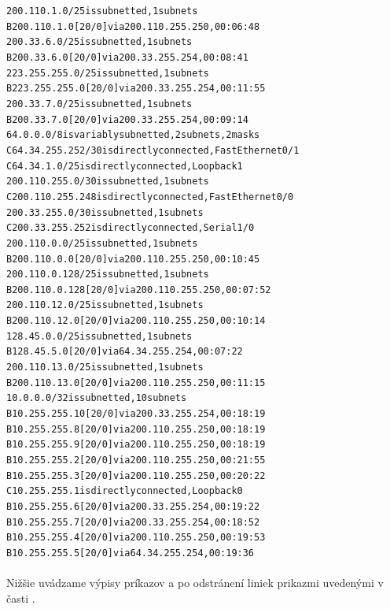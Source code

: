 \documentclass[12pt,twoside,a4paper]{report}
\begin{document}
{\begin{small}
\begin{alltt}
     200.110.1.0/25 is subnetted, 1 subnets
B       200.110.1.0 [20/0] via 200.110.255.250, 00:06:48
     200.33.6.0/25 is subnetted, 1 subnets
B       200.33.6.0 [20/0] via 200.33.255.254, 00:08:41
     223.255.255.0/25 is subnetted, 1 subnets
B       223.255.255.0 [20/0] via 200.33.255.254, 00:11:55
     200.33.7.0/25 is subnetted, 1 subnets
B       200.33.7.0 [20/0] via 200.33.255.254, 00:09:14
     64.0.0.0/8 is variably subnetted, 2 subnets, 2 masks
C       64.34.255.252/30 is directly connected, FastEthernet0/1
C       64.34.1.0/25 is directly connected, Loopback1
     200.110.255.0/30 is subnetted, 1 subnets
C       200.110.255.248 is directly connected, FastEthernet0/0
     200.33.255.0/30 is subnetted, 1 subnets
C       200.33.255.252 is directly connected, Serial1/0
     200.110.0.0/25 is subnetted, 1 subnets
B       200.110.0.0 [20/0] via 200.110.255.250, 00:10:45
     200.110.0.128/25 is subnetted, 1 subnets
B       200.110.0.128 [20/0] via 200.110.255.250, 00:07:52
     200.110.12.0/25 is subnetted, 1 subnets
B       200.110.12.0 [20/0] via 200.110.255.250, 00:10:14
     128.45.0.0/25 is subnetted, 1 subnets
B       128.45.5.0 [20/0] via 64.34.255.254, 00:07:22
     200.110.13.0/25 is subnetted, 1 subnets
B       200.110.13.0 [20/0] via 200.110.255.250, 00:11:15
     10.0.0.0/32 is subnetted, 10 subnets
B       10.255.255.10 [20/0] via 200.33.255.254, 00:18:19
B       10.255.255.8 [20/0] via 200.110.255.250, 00:18:19
B       10.255.255.9 [20/0] via 200.110.255.250, 00:18:19
B       10.255.255.2 [20/0] via 200.110.255.250, 00:21:55
B       10.255.255.3 [20/0] via 200.110.255.250, 00:20:22
C       10.255.255.1 is directly connected, Loopback0
B       10.255.255.6 [20/0] via 200.33.255.254, 00:19:22
B       10.255.255.7 [20/0] via 200.33.255.254, 00:18:52
B       10.255.255.4 [20/0] via 200.110.255.250, 00:19:53
B       10.255.255.5 [20/0] via 64.34.255.254, 00:19:36
\end{alltt}
\end{small}
}

\paragraph{}
Nižšie uvádzame výpisy príkazov  a  po odstránení liniek prikazmi uvedenými v časti .
\end{document}
